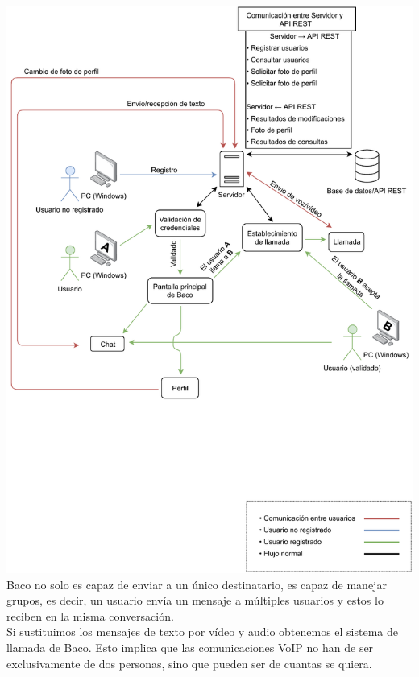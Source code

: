 \documentclass[12pt, a4paper]{book} %
\begin{document}
		\newpage
		\includegraphics[width=\textwidth,height=\textheight, keepaspectratio]{img/ArchitectureDiagram.pdf}\\
		Baco no solo es capaz de enviar a un único destinatario, es capaz de manejar grupos, es decir, un usuario envía un mensaje a múltiples usuarios y estos lo reciben en la misma conversación.\\
		Si sustituimos los mensajes de texto por vídeo y audio obtenemos el sistema de llamada de Baco. Esto implica que las comunicaciones VoIP no han de ser exclusivamente de dos personas, sino que pueden ser de cuantas se quiera.
\end{document}
